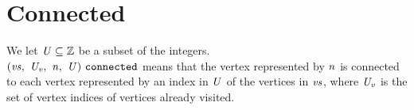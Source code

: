 \documentclass[12pt]{article}
\begin{document}
\section{Connected}

We let $\nterm{U} \subseteq \mathbb{Z}$ be a subset of the integers.\\

$\connected{\nterm{vs}}{\nterm{U_v}}{\nterm{n}}{\nterm{U}}$ means that the
vertex represented by $\nterm{n}$ is connected to each vertex represented by an
index in $\nterm{U}$ of the vertices in $\nterm{vs}$, where $\nterm{U_v}$ is the
set of vertex indices of vertices already visited.

\begin{mathpar}





\end{mathpar}
\end{document}
